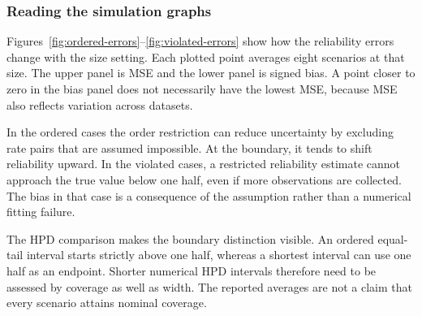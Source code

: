 \subsubsection{Reading the simulation graphs}
Figures~\ref{fig:ordered-errors}--\ref{fig:violated-errors} show how the reliability errors change with the size setting. Each plotted point averages eight scenarios at that size. The upper panel is MSE and the lower panel is signed bias. A point closer to zero in the bias panel does not necessarily have the lowest MSE, because MSE also reflects variation across datasets.

In the ordered cases the order restriction can reduce uncertainty by excluding rate pairs that are assumed impossible. At the boundary, it tends to shift reliability upward. In the violated cases, a restricted reliability estimate cannot approach the true value below one half, even if more observations are collected. The bias in that case is a consequence of the assumption rather than a numerical fitting failure.

The HPD comparison makes the boundary distinction visible. An ordered equal-tail interval starts strictly above one half, whereas a shortest interval can use one half as an endpoint. Shorter numerical HPD intervals therefore need to be assessed by coverage as well as width. The reported averages are not a claim that every scenario attains nominal coverage.

\FloatBarrier
